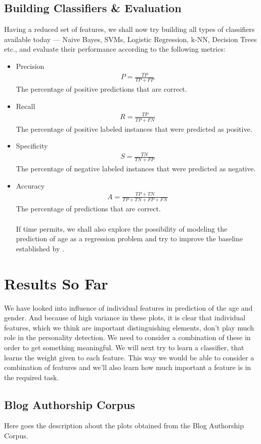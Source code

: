 \documentclass{sig-alternate}
\begin{document}
\subsection{Building Classifiers \& Evaluation}
Having a reduced set of features, we shall now try building all types of classifiers available today --- Naive Bayes, SVMs, Logistic Regression, k-NN, Decision Trees etc., and evaluate their performance according to the following metrics:
\begin{itemize}
\item Precision
\begin{align}
P = \frac{TP}{TP+FP}
\end{align}
The percentage of positive predictions that are correct.
\item Recall
\begin{align}
R =  \frac{TP}{TP+FN}
\end{align}
The percentage of positive labeled instances that were predicted as positive.
\item Specificity
\begin{align}
S = \frac{TN}{TN+FP}
\end{align}
The percentage of negative labeled instances that were predicted as negative.
\item Accuracy
\begin{align}
A = \frac{TP+TN}{TP + TN + FP + FN}
\end{align} The percentage of predictions that are correct.\\\\
If time permits, we shall also explore the possibility of modeling the prediction of age as a regression problem and try to improve the baseline established by \cite{cmu}. 
\end{itemize}
\section{Results So Far}
We have looked into influence of individual features in prediction of the age and gender. And because of high variance in these plots, it is clear that individual features, which we think are important distinguishing elements, don't play much role in the personality detection. We need to consider a combination of these in order to get something meaningful. We will next try to learn a classifier, that learns the weight given to each feature. This way we would be able to consider a combination of features and we'll also learn how much important a feature is in the required task.
\subsection{Blog Authorship Corpus}
Here goes the description about the plots obtained from the Blog Authorship Corpus.
\end{document}
